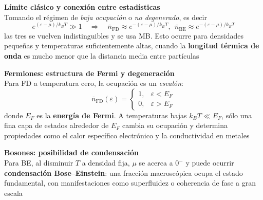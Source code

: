 \documentclass{article}
\begin{document}
\medskip

\noindent\textcolor{Cerulean}{\textbf{Límite clásico y conexión entre estadísticas}} \\
Tomando el régimen de \textit{baja ocupación} o \textit{no degenerado}, es decir
\begin{equation}\label{eq:clasico}
e^{(\varepsilon-\mu)/k_B T}\gg 1 \quad\Longrightarrow\quad
\overline{n}_{\text{FD}}\approx e^{-(\varepsilon-\mu)/k_BT},\ \
\overline{n}_{\text{BE}}\approx e^{-(\varepsilon-\mu)/k_BT}
\end{equation}
las tres se vuelven indistinguibles y se usa MB. Esto ocurre para densidades pequeñas y temperaturas suficientemente altas, cuando la \textcolor{Cerulean}{\textbf{longitud térmica de onda}} es mucho menor que la distancia media entre partículas

\medskip

\noindent\textcolor{Cerulean}{\textbf{Fermiones: estructura de Fermi y degeneración}} \\
Para FD a temperatura cero, la ocupación es un \textit{escalón}:
\begin{equation}\label{eq:FD-T0}
\overline{n}_{\text{FD}}(\varepsilon)=
\begin{cases}
1,& \varepsilon<E_F\\
0,& \varepsilon>E_F
\end{cases}
\end{equation}
donde $E_F$ es la \textcolor{Cerulean}{\textbf{energía de Fermi}}. A temperaturas bajas $k_B T\ll E_F$, sólo una fina capa de estados alrededor de $E_F$ cambia su ocupación y determina propiedades como el calor específico electrónico y la conductividad en metales

\medskip

\noindent\textcolor{Cerulean}{\textbf{Bosones: posibilidad de condensación}} \\
Para BE, al disminuir $T$ a densidad fija, $\mu$ se acerca a $0^{-}$ y puede ocurrir \textcolor{Cerulean}{\textbf{condensación Bose–Einstein}}: una fracción macroscópica ocupa el estado fundamental, con manifestaciones como superfluidez o coherencia de fase a gran escala

\medskip
\end{document}
